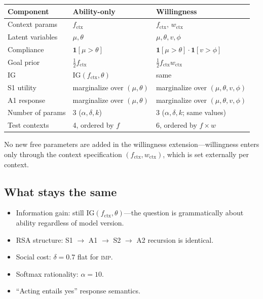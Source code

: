\documentclass[11pt]{article}
\begin{document}
\begin{center}
\renewcommand{\arraystretch}{1.3}
\begin{tabular}{lll}
\toprule
\textbf{Component} & \textbf{Ability-only} & \textbf{Willingness} \\
\midrule
Context params   & $f_{\text{ctx}}$ & $f_{\text{ctx}},\, w_{\text{ctx}}$ \\
Latent variables & $\mu, \theta$ & $\mu, \theta, v, \phi$ \\
Compliance       & $\mathbf{1}[\mu > \theta]$ & $\mathbf{1}[\mu > \theta]\cdot\mathbf{1}[v > \phi]$ \\
Goal prior       & $\frac{1}{2}f_{\text{ctx}}$ & $\frac{1}{2}f_{\text{ctx}} w_{\text{ctx}}$ \\
IG               & $\mathrm{IG}(f_{\text{ctx}}, \theta)$ & same \\
S1 utility       & marginalize over $(\mu, \theta)$ & marginalize over $(\mu, \theta, v, \phi)$ \\
A1 response      & marginalize over $(\mu, \theta)$ & marginalize over $(\mu, \theta, v, \phi)$ \\
Number of params & 3 ($\alpha, \delta, k$) & 3 ($\alpha, \delta, k$; same values) \\
Test contexts    & 4, ordered by $f$ & 6, ordered by $f \times w$ \\
\bottomrule
\end{tabular}
\end{center}

No new free parameters are added in the willingness extension---willingness enters
only through the context specification $(f_{\text{ctx}}, w_{\text{ctx}})$, which is
set externally per context.

\subsection{What stays the same}

\begin{itemize}
  \item Information gain: still $\mathrm{IG}(f_{\text{ctx}}, \theta)$---the question
        is grammatically about ability regardless of model version.
  \item RSA structure: S1 $\to$ A1 $\to$ S2 $\to$ A2 recursion is identical.
  \item Social cost: $\delta = 0.7$ flat for \textsc{imp}.
  \item Softmax rationality: $\alpha = 10$.
  \item ``Acting entails yes'' response semantics.
\end{itemize}
\end{document}
